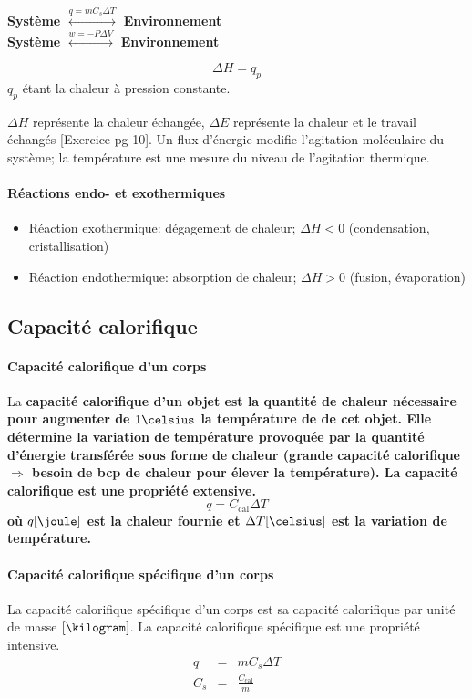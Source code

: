 \documentclass[11pt,a4paper,french]{article}
\renewcommand{\textbf}[1]{\begingroup\bfseries\mathversion{bold}#1\endgroup}
\newcommand\ccal{C_\mathrm{cal}}
\begin{document}
\textbf{Système} $\stackrel{q=mC_s\Delta T}{\longleftrightarrow}$ \textbf{Environnement}\\

\textbf{Système} $\stackrel{w=-P\Delta V}{\longleftrightarrow}$ \textbf{Environnement}

$$\Delta H=q_p$$ $q_p$ étant la chaleur à pression constante.

$\Delta H$ représente la chaleur échangée, $\Delta E$ représente la chaleur et le travail échangés [Exercice pg 10].
Un flux d'énergie modifie l'agitation moléculaire du système; la température est une mesure du niveau de l'agitation thermique.

\paragraph{Réactions endo- et exothermiques}
\begin{itemize}
\item Réaction exothermique: dégagement de chaleur; $\Delta H<0$ (condensation, cristallisation)
\item Réaction endothermique: absorption de chaleur; $\Delta H>0$ (fusion, évaporation)
\end{itemize}

\subsection{Capacité calorifique}
\paragraph{Capacité calorifique d'un corps} \label{sec:C_cal}
La \textbf{capacité calorifique} d'un objet est la quantité de chaleur nécessaire pour augmenter de $1\celsius$ la température de  de cet objet.
Elle détermine la variation de température provoquée par la quantité d'énergie transférée sous forme de chaleur (grande capacité calorifique $\Rightarrow$ besoin de bcp de chaleur pour élever la température).
La capacité calorifique est une propriété extensive.
\[ q = \ccal \Delta T \]
où $q[\joule]$ est la chaleur fournie et $\Delta T[\celsius]$ est la variation de température. %

\paragraph{Capacité calorifique spécifique d'un corps} \label{sec:C_s}
La capacité calorifique spécifique d'un corps est sa capacité calorifique par unité de masse $[\kilogram]$.
La capacité calorifique spécifique est une propriété intensive.
\begin{eqnarray*}
	q &=& m C_s \Delta T\\
	C_s &=& \frac{\ccal}{m}
\end{eqnarray*}
\end{document}
